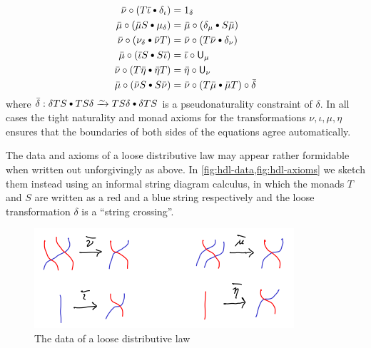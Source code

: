\documentclass{amsart}
\newcommand{\bcomp}{\mathbin{\raisebox{1pt}{\scriptsize$\bullet$}}}
\newcommand{\hunit}[1]{\mathsf{U}_{#1}}
\newcommand{\Tmult}{\nu}
\newcommand{\Tunit}{\iota}
\newcommand{\Smult}{\mu}
\newcommand{\Sunit}{\eta}
\newcommand{\dl}{\delta}
\newcommand{\dlnat}{\bar\delta}
\newcommand{\Tdlmult}{\bar\Tmult}%
\newcommand{\Sdlmult}{\bar\Smult}%
\newcommand{\Tdlunit}{\bar\Tunit}%
\newcommand{\Sdlunit}{\bar\Sunit}%
\begin{document}
\begin{defn}
\begin{enumerate}
\begin{align*}
        \Tdlmult \circ (T\Tdlunit \bcomp \dl_{\Tunit}) &= 1_\dl \\  %
        \Sdlmult \circ (\Sdlmult S\bcomp \Smult_\dl) &= \Sdlmult \circ (\dl_{\Smult} \bcomp S \Sdlmult) \\ %
        \Tdlmult \circ (\Tmult_\dl\bcomp \Tdlmult T) &= \Tdlmult \circ (T \Tdlmult\bcomp \dl_{\Tmult}) \\ %
        \Sdlmult \circ (\Tdlunit S\bcomp S\Tdlunit) &= \Tdlunit \circ \hunit{\Smult} \\ %
        \Tdlmult \circ (T\Sdlunit\bcomp \Sdlunit T) &= \Sdlunit \circ \hunit{\Tmult} \\ %
        \Sdlmult \circ (\Tdlmult S\bcomp S\Tdlmult) &= \Tdlmult \circ (T\Sdlmult\bcomp \Sdlmult T) \circ \dlnat %
      \end{align*}
      where $\dlnat : \dl TS \bcomp TS \dl \toiso TS \dl \bcomp \dl TS$ is a pseudonaturality constraint of $\dl$.
      In all cases the tight naturality and monad axioms for the transformations $\Tmult,\Tunit,\Smult,\Sunit$ ensures that the boundaries of both sides of the equations agree automatically.
  \end{enumerate}
\end{defn}

The data and axioms of a loose distributive law may appear rather formidable when written out unforgivingly as above.
In \cref{fig:hdl-data,fig:hdl-axioms} we sketch them instead using an informal string diagram calculus, in which the monads $T$ and $S$ are written as a red and a blue string respectively and the loose transformation $\dl$ is a ``string crossing''.

\begin{figure}
  \centering
  \includegraphics{hdl-data.png}
  \caption{The data of a loose distributive law}
  \label{fig:hdl-data}
\end{figure}
\end{document}
